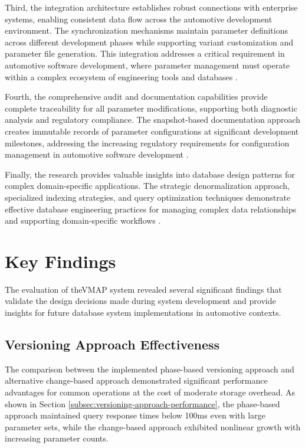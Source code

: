 Third, the integration architecture establishes robust connections with enterprise systems, enabling consistent data flow across the automotive development environment. The synchronization mechanisms maintain parameter definitions across different development phases while supporting variant customization and parameter file generation. This integration addresses a critical requirement in automotive software development, where parameter management must operate within a complex ecosystem of engineering tools and databases \cite{hohpe2002enterprise}.

Fourth, the comprehensive audit and documentation capabilities provide complete traceability for all parameter modifications, supporting both diagnostic analysis and regulatory compliance. The snapshot-based documentation approach creates immutable records of parameter configurations at significant development milestones, addressing the increasing regulatory requirements for configuration management in automotive software development \cite{staron2021automotive}.

Finally, the research provides valuable insights into database design patterns for complex domain-specific applications. The strategic denormalization approach, specialized indexing strategies, and query optimization techniques demonstrate effective database engineering practices for managing complex data relationships and supporting domain-specific workflows \cite{obe2017postgresql}.

\section{Key Findings}
\label{sec:key-findings}

The evaluation of the\ac{VMAP} system revealed several significant findings that validate the design decisions made during system development and provide insights for future database system implementations in automotive contexts.

\subsection{Versioning Approach Effectiveness}
\label{subsec:versioning-effectiveness}

The comparison between the implemented phase-based versioning approach and alternative change-based approach demonstrated significant performance advantages for common operations at the cost of moderate storage overhead. As shown in Section \ref{subsec:versioning-approach-performance}, the phase-based approach maintained query response times below 100ms even with large parameter sets, while the change-based approach exhibited nonlinear growth with increasing parameter counts.

